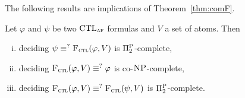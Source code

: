 \documentclass{article}
\begin{document}





The following results are implications of Theorem~\ref{thm:comF}.
\begin{corollary}
Let $\varphi$ and $\psi$ be two $\textrm{CTL}_{\textsc{a} \textsc{f}}$ formulas and $V$ a set of atoms. Then
\begin{enumerate}[(i)]
  \item deciding $\psi \equiv^?{\textsc{F}_{\textsc{ctl}}}(\varphi, V)$ is $\Pi_2^{\textsc{P}}$-complete,
  \item deciding ${\textsc{F}_{\textsc{ctl}}}(\varphi, V) \equiv^? \varphi$ is co-$\textsc{NP}$-complete,
  \item deciding ${\textsc{F}_{\textsc{ctl}}}(\varphi, V) \equiv^? {\textsc{F}_{\textsc{ctl}}}(\psi, V)$ is $\Pi_2^{\textsc{P}}$-complete.
\end{enumerate}
\end{corollary}
\end{document}
